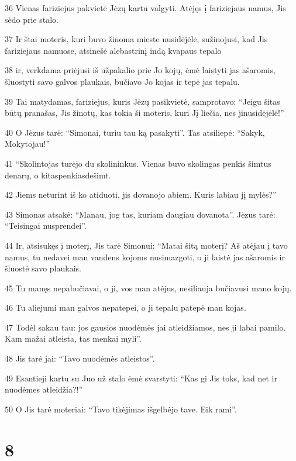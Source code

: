 \par 36 Vienas fariziejus pakvietė Jėzų kartu valgyti. Atėjęs į fariziejaus namus, Jis sėdo prie stalo. 
\par 37 Ir štai moteris, kuri buvo žinoma mieste nusidėjėlė, sužinojusi, kad Jis fariziejaus namuose, atsinešė alebastrinį indą kvapaus tepalo 
\par 38 ir, verkdama priėjusi iš užpakalio prie Jo kojų, ėmė laistyti jas ašaromis, šluostyti savo galvos plaukais, bučiavo Jo kojas ir tepė jas tepalu. 
\par 39 Tai matydamas, fariziejus, kuris Jėzų pasikvietė, samprotavo: “Jeigu šitas būtų pranašas, Jis žinotų, kas tokia ši moteris, kuri Jį liečia, nes ji­nusidėjėlė!” 
\par 40 O Jėzus tarė: “Simonai, turiu tau ką pasakyti”. Tas atsiliepė: “Sakyk, Mokytojau!” 
\par 41 “Skolintojas turėjo du skolininkus. Vienas buvo skolingas penkis šimtus denarų, o kitas­penkiasdešimt. 
\par 42 Jiems neturint iš ko atiduoti, jis dovanojo abiem. Kuris labiau jį mylės?” 
\par 43 Simonas atsakė: “Manau, jog tas, kuriam daugiau dovanota”. Jėzus tarė: “Teisingai nusprendei”. 
\par 44 Ir, atsisukęs į moterį, Jis tarė Simonui: “Matai šitą moterį? Aš atėjau į tavo namus, tu nedavei man vandens kojoms nusimazgoti, o ji laistė jas ašaromis ir šluostė savo plaukais. 
\par 45 Tu manęs nepabučiavai, o ji, vos man atėjus, nesiliauja bučiavusi mano kojų. 
\par 46 Tu aliejumi man galvos nepatepei, o ji tepalu patepė man kojas. 
\par 47 Todėl sakau tau: jos gausios nuodėmės jai atleidžiamos, nes ji labai pamilo. Kam mažai atleista, tas menkai myli”. 
\par 48 Jis tarė jai: “Tavo nuodėmės atleistos”. 
\par 49 Esantieji kartu su Juo už stalo ėmė svarstyti: “Kas gi Jis toks, kad net ir nuodėmes atleidžia?!” 
\par 50 O Jis tarė moteriai: “Tavo tikėjimas išgelbėjo tave. Eik rami”.



\chapter{8}


